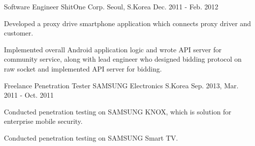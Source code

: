 \begin{cventries}
  \cventry
    {Software Engineer} %
    {ShitOne Corp.} %
    {Seoul, S.Korea} %
    {Dec. 2011 - Feb. 2012} %
    {
      \begin{cvitems} %
        \item {Developed a proxy drive smartphone application which connects proxy driver and customer.}
        \item {Implemented overall Android application logic and wrote API server for community service, along with lead engineer who designed bidding protocol on raw socket and implemented API server for bidding.}
      \end{cvitems}
    }

  \cventry
    {Freelance Penetration Tester} %
    {SAMSUNG Electronics} %
    {S.Korea} %
    {Sep. 2013, Mar. 2011 - Oct. 2011} %
    {
      \begin{cvitems} %
        \item {Conducted penetration testing on SAMSUNG KNOX, which is solution for enterprise mobile security.}
        \item {Conducted penetration testing on SAMSUNG Smart TV.}
      \end{cvitems}
    }

\end{cventries}
